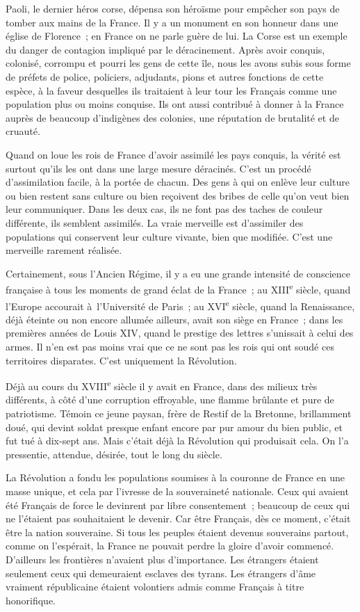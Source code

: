 \documentclass[french,twoside]{book} %
\begin{document}
Paoli, le dernier héros corse, dépensa son héroïsme pour empêcher son pays de tomber aux mains de la France. Il y a un monument en son honneur dans une église de Florence ; en France on ne parle guère de lui. La Corse est un exemple du danger de contagion impliqué par le déracinement. Après avoir conquis, colonisé, corrompu et pourri les gens de cette île, nous les avons subis sous forme de préfets de police, policiers, adjudants, pions et autres fonctions de cette espèce, à la faveur desquelles ils traitaient à leur tour les Français comme une population plus ou moins conquise. Ils ont aussi contribué à donner à la France auprès de beaucoup d'indigènes des colonies, une réputation de brutalité et de cruauté.\par
Quand on loue les rois de France d'avoir assimilé les pays conquis, la vérité est surtout qu'ils les ont dans une large mesure déracinés. C'est un procédé d'assimilation facile, à la portée de chacun. Des gens à qui on enlève leur culture ou bien restent sans culture ou bien reçoivent des bribes de celle qu'on veut bien leur communiquer. Dans les deux cas, ils ne font pas des taches de couleur différente, ils semblent assimilés. La vraie merveille est d'assimiler des populations qui conservent leur culture vivante, bien que modifiée. C'est une merveille rarement réalisée.\par
Certainement, sous l'Ancien Régime, il y a eu une grande intensité de conscience française à tous les moments de grand éclat de la France ; au XIII\textsuperscript{e} siècle, quand l'Europe accourait à l'Université de Paris ; au XVI\textsuperscript{e} siècle, quand la Renaissance, déjà éteinte ou non encore allumée ailleurs, avait son siège en France ; dans les premières années de Louis XIV, quand le prestige des lettres s'unissait à celui des armes. Il n'en est pas moins vrai que ce ne sont pas les rois qui ont soudé ces territoires disparates. C'est uniquement la Révolution.\par
Déjà au cours du XVIII\textsuperscript{e} siècle il y avait en France, dans des milieux très différents, à côté d'une corruption effroyable, une flamme brûlante et pure de patriotisme. Témoin ce jeune paysan, frère de Restif de la Bretonne, brillamment doué, qui devint soldat presque enfant encore par pur amour du bien public, et fut tué à dix-sept ans. Mais c'était déjà la Révolution qui produisait cela. On l'a pressentie, attendue, désirée, tout le long du siècle.\par
La Révolution a fondu les populations soumises à la couronne de France en une masse unique, et cela par l'ivresse de la souveraineté nationale. Ceux qui avaient été Français de force le devinrent par libre consentement ; beaucoup de ceux qui ne l'étaient pas souhaitaient le devenir. Car être Français, dès ce moment, c'était être la nation souveraine. Si tous les peuples étaient devenus souverains partout, comme on l'espérait, la France ne pouvait perdre la gloire d'avoir commencé. D'ailleurs les frontières n'avaient plus d'importance. Les étrangers étaient seulement ceux qui demeuraient esclaves des tyrans. Les étrangers d'âme vraiment républicaine étaient volontiers admis comme Français à titre honorifique.\par
\end{document}

